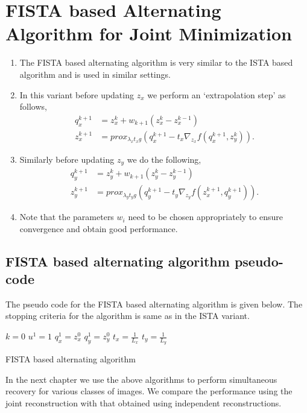 \section{FISTA based Alternating Algorithm for Joint Minimization}
\begin{enumerate}
\item The FISTA based alternating algorithm is very similar to the ISTA based algorithm and is used in similar settings.
\item In this variant before updating $z_x$ we perform an `extrapolation step' as follows,
 \begin{align}
  q_x^{k+1} &= z_x^k + w_{k+1} (z_x^k - z_x^{k-1}) \\
  z_x^{k+1} &= prox_{\lambda_x t_xg} \left( q_x^{k+1} - t_x \nabla_{z_x} f(q_x^{k+1}, z_y^k) \right).
 \end{align}
 \item Similarly before updating $z_y$ we do the following,
 \begin{align}
  q_y^{k+1} &= z_y^k + w_{k+1} (z_y^k - z_y^{k-1}) \\
  z_y^{k+1} &= prox_{\lambda_y t_yg} \left( q_y^{k+1} - t_y \nabla_{z_y} f(z_x^{k+1}, q_y^{k+1}) \right).
 \end{align}
 \item Note that the parameters $w_i$  need to be chosen appropriately to ensure convergence and obtain good performance. 
 \end{enumerate}
 
 
\subsection{FISTA based alternating algorithm pseudo-code}
The pseudo code for the FISTA based alternating algorithm is given below. The stopping criteria for the algorithm is same as in the ISTA variant.

\begin{algorithm}[H]
 $k = 0 $ \;
 $u^1 = 1 $ \;
 $q_x^1 = z_x^0$ \; 
 $q_y^1 = z_y^0$ \;
 $t_x = \frac{1}{L_x}$ \;
 $t_y = \frac{1}{L_y}$ \;
 
 \caption{FISTA based alternating algorithm}
\end{algorithm}

In the next chapter we use the above algorithms to perform simultaneous recovery for various classes of images. We compare the performance using the joint reconstruction with that obtained using independent reconstructions.